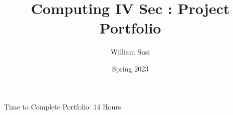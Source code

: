 \documentclass[12pt]{article}
\author{William Susi}
\date{Spring 2023}
\title{Computing IV Sec \secno: Project Portfolio}
\newcommand{\timetocomplete}{14 Hours}
\begin{document}
\maketitle

\tableofcontents

\vfill
Time to Complete Portfolio: \timetocomplete

\newpage

 







\end{document}
